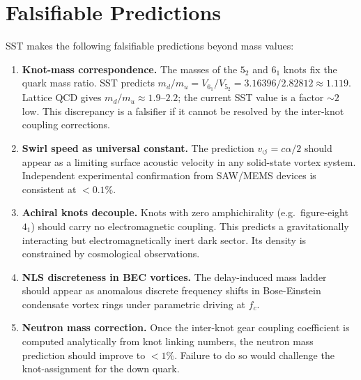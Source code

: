 \documentclass[11pt,a4paper]{article}
\begin{document}
\section{Falsifiable Predictions}\label{sec:falsifiers}

SST makes the following falsifiable predictions beyond mass values:

\begin{enumerate}
  \item \textbf{Knot-mass correspondence.} The masses of the $5_2$ and $6_1$ knots
        fix the quark mass ratio. SST predicts
        $m_d / m_u = V_{6_1}/V_{5_2} = 3.16396/2.82812 \approx 1.119$.
        Lattice QCD gives $m_d/m_u \approx 1.9$--$2.2$; the current SST value is a
        factor $\sim 2$ low. This discrepancy is a falsifier if it cannot be resolved
        by the inter-knot coupling corrections.

  \item \textbf{Swirl speed as universal constant.} The prediction
        $v_{\circlearrowleft} = c\alpha/2$ should appear as a limiting surface
        acoustic velocity in any solid-state vortex system. Independent experimental
        confirmation from SAW/MEMS devices \cite{Iskandarani2026AIP} is consistent
        at $< 0.1\%$.

  \item \textbf{Achiral knots decouple.} Knots with zero amphichirality
        (e.g.\ figure-eight $4_1$) should carry no electromagnetic coupling.
        This predicts a gravitationally interacting but electromagnetically inert
        dark sector. Its density is constrained by cosmological observations.

  \item \textbf{NLS discreteness in BEC vortices.} The delay-induced mass ladder
        should appear as anomalous discrete frequency shifts in Bose-Einstein
        condensate vortex rings under parametric driving at $f_c$.

  \item \textbf{Neutron mass correction.} Once the inter-knot gear coupling
        coefficient is computed analytically from knot linking numbers, the
        neutron mass prediction should improve to $< 1\%$. Failure to do so
        would challenge the knot-assignment for the down quark.
\end{enumerate}

\end{document}
